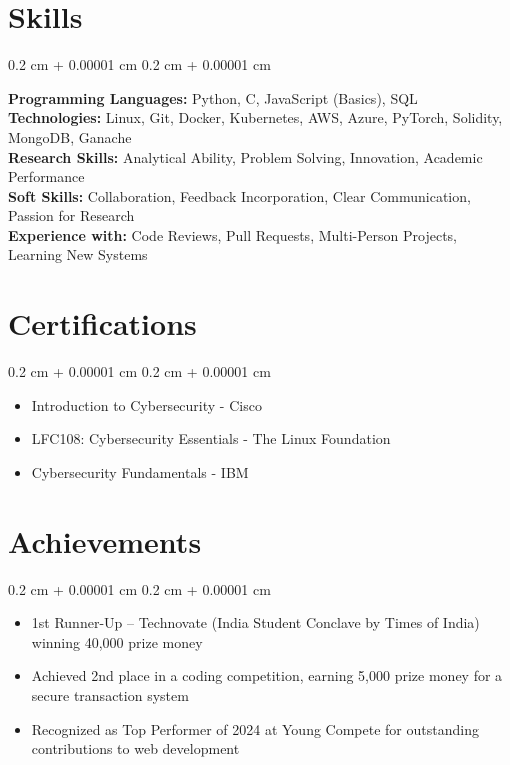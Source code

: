 \documentclass[10pt, letterpaper]{article}
\newenvironment{highlights}{
    \begin{itemize}[
        topsep=0.10 cm,
        parsep=0.10 cm,
        partopsep=0pt,
        itemsep=0pt,
        leftmargin=0.4 cm + 10pt
    ]
}{
    \end{itemize}
} %
\newenvironment{onecolentry}{
    \begin{adjustwidth}{
        0.2 cm + 0.00001 cm
    }{
        0.2 cm + 0.00001 cm
    }
}{
    \end{adjustwidth}
} %
\let\hrefWithoutArrow\href
\renewcommand{\href}[2]{\hrefWithoutArrow{#1}{\ifthenelse{\equal{#2}{}}{ }{#2 }\raisebox{.15ex}{\footnotesize \faExternalLink*}}}
\begin{document}
    \section{Skills}
    \begin{onecolentry}
        \textbf{Programming Languages:} Python, C, JavaScript (Basics), SQL \\
        \textbf{Technologies:} Linux, Git, Docker, Kubernetes, AWS, Azure, PyTorch, Solidity, MongoDB, Ganache \\
        \textbf{Research Skills:} Analytical Ability, Problem Solving, Innovation, Academic Performance \\
        \textbf{Soft Skills:} Collaboration, Feedback Incorporation, Clear Communication, Passion for Research \\
        \textbf{Experience with:} Code Reviews, Pull Requests, Multi-Person Projects, Learning New Systems
    \end{onecolentry}
    \section{Certifications}
    \begin{onecolentry}
        \begin{highlights}
            \item Introduction to Cybersecurity - Cisco \href{https://www.credly.com/badges/a7c00b29-a55e-42e6-8fa6-90174db3e9d7/public_url}{\textcolor{primaryColor}{\small [View Certificate]}}
            \item LFC108: Cybersecurity Essentials - The Linux Foundation \href{https://www.credly.com/badges/50d5dd68-4744-4b04-b719-3f0658e97910/public_url}{\textcolor{primaryColor}{\small [View Certificate]}}
            \item Cybersecurity Fundamentals - IBM \href{https://www.credly.com/badges/0e03da41-f13a-4a06-9835-caf8a48ac10d/public_url}{\textcolor{primaryColor}{\small [View Certificate]}}
        \end{highlights}
    \end{onecolentry}
    \section{Achievements}
    \begin{onecolentry}
        \begin{highlights}
            \item 1st Runner-Up – Technovate (India Student Conclave by Times of India) winning 40,000 prize money
            \item Achieved 2nd place in a coding competition, earning 5,000 prize money for a secure transaction system
            \item Recognized as Top Performer of 2024 at Young Compete for outstanding contributions to web development
        \end{highlights}
    \end{onecolentry}
\end{document}
